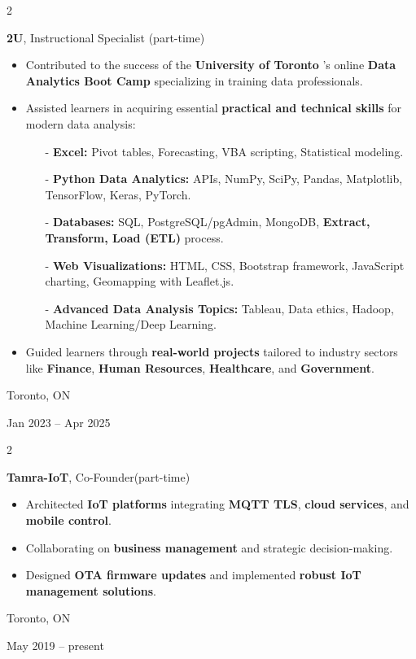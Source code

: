 \documentclass[10pt, letterpaper]{article}
\newenvironment{highlights}{
    \begin{itemize}[
        topsep=0.10 cm,
        parsep=0.10 cm,
        partopsep=0pt,
        itemsep=0pt,
        leftmargin=0.4 cm + 10pt
    ]
}{
    \end{itemize}
} %
\newenvironment{twocolentry}[2][]{
    \onecolentry
    \def\secondColumn{#2}
    \setcolumnwidth{\fill, 4.5 cm}
    \begin{paracol}{2}
}{
    \switchcolumn \raggedleft \secondColumn
    \end{paracol}
    \endonecolentry
} %
\begin{document}
        \begin{twocolentry}{
            Toronto, ON

        Jan 2023 – Apr 2025
        }
            \textbf{2U}, Instructional Specialist (part-time)
    
            \begin{highlights}
    \item Contributed to the success of the \textbf{University of Toronto} 's online \textbf{Data Analytics Boot Camp} specializing in training data professionals.
    \item Assisted learners in acquiring essential \textbf{practical and technical skills} for modern data analysis:
    \begin{enumerate}
        \item[-] \textbf{Excel:} Pivot tables, Forecasting, VBA scripting, Statistical modeling.
        \item[-] \textbf{Python Data Analytics:} APIs, NumPy, SciPy, Pandas, Matplotlib, TensorFlow, Keras, PyTorch.
        \item[-] \textbf{Databases:} SQL, PostgreSQL/pgAdmin, MongoDB, \textbf{Extract, Transform, Load (ETL)} process.
        \item[-] \textbf{Web Visualizations:} HTML, CSS, Bootstrap framework, JavaScript charting, Geomapping with Leaflet.js.
        \item[-] \textbf{Advanced Data Analysis Topics:} Tableau, Data ethics, Hadoop, Machine Learning/Deep Learning.
    \end{enumerate}
    \item Guided learners through \textbf{real-world projects} tailored to industry sectors like \textbf{Finance}, \textbf{Human Resources}, \textbf{Healthcare}, and \textbf{Government}.
\end{highlights}

        \end{twocolentry}
     \vspace{0.2 cm}
\begin{twocolentry}{
            Toronto, ON

        May 2019 – present
        }
            \textbf{Tamra-IoT}, Co-Founder(part-time)
        \begin{highlights}
            \item Architected \textbf{IoT platforms} integrating \textbf{MQTT TLS}, \textbf{cloud services}, and \textbf{mobile control}.
            \item Collaborating on \textbf{business management} and strategic decision-making.
            \item Designed \textbf{OTA firmware updates} and implemented \textbf{robust IoT management solutions}.
        \end{highlights}

        \end{twocolentry}
\end{document}

